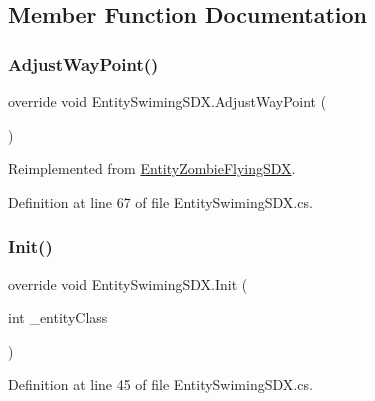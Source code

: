 \subsection{Member Function Documentation}
\mbox{\label{class_entity_swiming_s_d_x_a8af397ffcf21b5433962243f2e110373}} 
\subsubsection{\texorpdfstring{AdjustWayPoint()}{AdjustWayPoint()}}
{\footnotesize\ttfamily override void Entity\+Swiming\+S\+D\+X.\+Adjust\+Way\+Point (\begin{DoxyParamCaption}{ }\end{DoxyParamCaption})\hspace{0.3cm}{\ttfamily [virtual]}}



Reimplemented from \mbox{\hyperlink{class_entity_zombie_flying_s_d_x_a51bebc522872f4939ff7e2a6ae43a0b6}{Entity\+Zombie\+Flying\+S\+DX}}.



Definition at line 67 of file Entity\+Swiming\+S\+D\+X.\+cs.

\mbox{\label{class_entity_swiming_s_d_x_acc349e8ff9afcdf5cbbadb8c4b2e8f92}} 
\subsubsection{\texorpdfstring{Init()}{Init()}}
{\footnotesize\ttfamily override void Entity\+Swiming\+S\+D\+X.\+Init (\begin{DoxyParamCaption}\item[{int}]{\+\_\+entity\+Class }\end{DoxyParamCaption})}



Definition at line 45 of file Entity\+Swiming\+S\+D\+X.\+cs.

\mbox{\label{class_entity_swiming_s_d_x_a7ad69a9b6d2777bb904742c40b3eb4fe}} 
